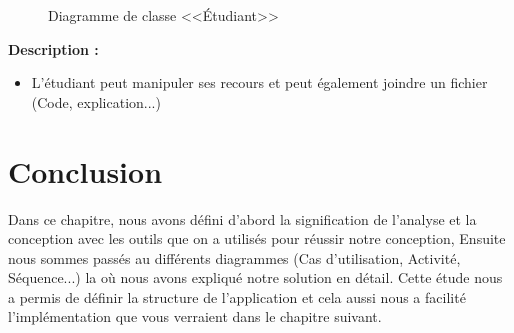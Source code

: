 \documentclass[12pt]{report}
\begin{document}
\begin{figure}[h]
\centering
    \centerline{}
    \caption{Diagramme de classe <<Étudiant>>}
\end{figure}

\vspace{-0.1in}

\textbf{Description :}

\vspace{-0.1in}
\begin{itemize}
    \item L'étudiant peut manipuler ses recours et peut également joindre un fichier (Code, explication...)
\end{itemize}

\vspace{-0.4in}

\section{Conclusion}
Dans ce chapitre, nous avons défini d'abord la signification de l'analyse et la conception avec les outils que on a utilisés pour réussir notre conception, Ensuite nous sommes passés au différents diagrammes (Cas d'utilisation, Activité, Séquence...) la où nous avons expliqué notre solution en détail. Cette étude nous a permis de définir la structure de l’application et cela aussi nous a facilité l’implémentation que vous verraient dans le chapitre suivant.
\end{document}

